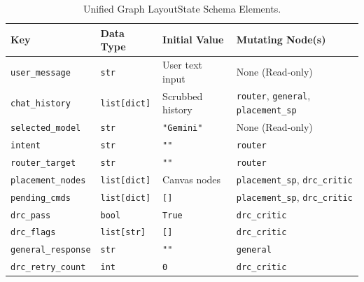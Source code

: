 \begin{table}[htbp]
    \centering
    \caption{Unified Graph LayoutState Schema Elements.}
    \label{tab:layout_state_details}
    \begin{tabularx}{\textwidth}{l p{2.2cm} l X}
        \toprule
        \textbf{Key} & \textbf{Data Type} & \textbf{Initial Value} & \textbf{Mutating Node(s)} \\
        \midrule
        \texttt{user\_message} & \texttt{str} & User text input & None (Read-only) \\
        \texttt{chat\_history} & \texttt{list[dict]} & Scrubbed history & \texttt{router}, \texttt{general}, \texttt{placement\_sp} \\
        \texttt{selected\_model} & \texttt{str} & \texttt{"Gemini"} & None (Read-only) \\
        \texttt{intent} & \texttt{str} & \texttt{""} & \texttt{router} \\
        \texttt{router\_target} & \texttt{str} & \texttt{""} & \texttt{router} \\
        \texttt{placement\_nodes} & \texttt{list[dict]} & Canvas nodes & \texttt{placement\_sp}, \texttt{drc\_critic} \\
        \texttt{pending\_cmds} & \texttt{list[dict]} & \texttt{[]} & \texttt{placement\_sp}, \texttt{drc\_critic} \\
        \texttt{drc\_pass} & \texttt{bool} & \texttt{True} & \texttt{drc\_critic} \\
        \texttt{drc\_flags} & \texttt{list[str]} & \texttt{[]} & \texttt{drc\_critic} \\
        \texttt{general\_response} & \texttt{str} & \texttt{""} & \texttt{general} \\
        \texttt{drc\_retry\_count} & \texttt{int} & \texttt{0} & \texttt{drc\_critic} \\
        \bottomrule
    \end{tabularx}
\end{table}

